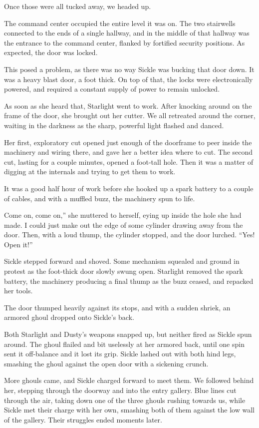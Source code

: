 Once those were all tucked away, we headed up.

The command center occupied the entire level it was on. The two stairwells connected to the ends of a single hallway, and in the middle of that hallway was the entrance to the command center, flanked by fortified security positions. As expected, the door was locked.

This posed a problem, as there was no way Sickle was bucking that door down. It was a heavy blast door, a foot thick. On top of that, the locks were electronically powered, and required a constant supply of power to remain unlocked.

As soon as she heard that, Starlight went to work. After knocking around on the frame of the door, she brought out her cutter. We all retreated around the corner, waiting in the darkness as the sharp, powerful light flashed and danced.

Her first, exploratory cut opened just enough of the doorframe to peer inside the machinery and wiring there, and gave her a better idea where to cut. The second cut, lasting for a couple minutes, opened a foot-tall hole. Then it was a matter of digging at the internals and trying to get them to work.

It was a good half hour of work before she hooked up a spark battery to a couple of cables, and with a muffled buzz, the machinery spun to life.

\leavevmode{}Come on, come on,” she muttered to herself, eying up inside the hole she had made. I could just make out the edge of some cylinder drawing away from the door. Then, with a loud thump, the cylinder stopped, and the door lurched. “Yes! Open it!”

Sickle stepped forward and shoved. Some mechanism squealed and ground in protest as the foot-thick door slowly swung open. Starlight removed the spark battery, the machinery producing a final thump as the buzz ceased, and repacked her tools.

The door thumped heavily against its stops, and with a sudden shriek, an armored ghoul dropped onto Sickle’s back.

Both Starlight and Dusty’s weapons snapped up, but neither fired as Sickle spun around. The ghoul flailed and bit uselessly at her armored back, until one spin sent it off-balance and it lost its grip. Sickle lashed out with both hind legs, smashing the ghoul against the open door with a sickening crunch.

More ghouls came, and Sickle charged forward to meet them. We followed behind her, stepping through the doorway and into the entry gallery. Blue lines cut through the air, taking down one of the three ghouls rushing towards us, while Sickle met their charge with her own, smashing both of them against the low wall of the gallery. Their struggles ended moments later.

